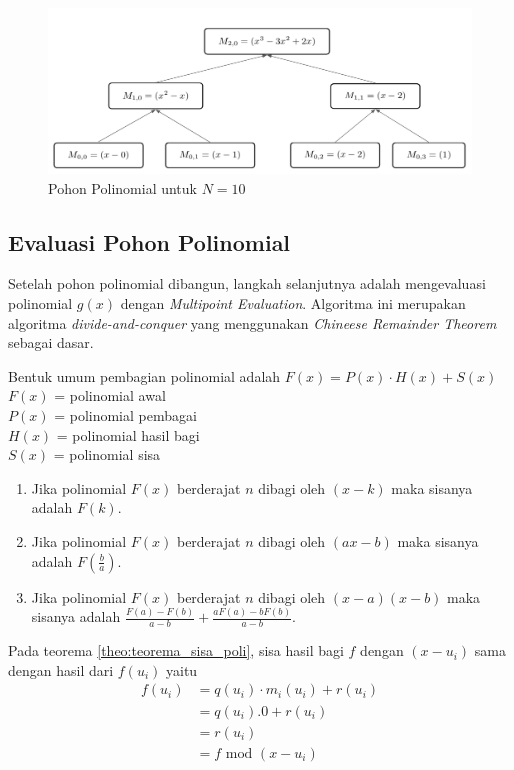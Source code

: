 \begin{figure}
	\Centering
	\includegraphics [scale=0.25]{bab2/img/pohon-polinomial-n-10}
	\caption {Pohon Polinomial untuk $ N  = 10 $}
	\label {fig:pohon-polinomial-n-10}
\end{figure}

\subsection{ Evaluasi Pohon Polinomial}
\label{sec:evaluasi_pohon_polinomial}
Setelah pohon polinomial dibangun, langkah selanjutnya adalah mengevaluasi polinomial $ g(x) $ dengan \textit{Multipoint Evaluation}. Algoritma ini merupakan algoritma \textit{divide-and-conquer} yang menggunakan \textit{Chineese Remainder Theorem} sebagai dasar.
\begin{theo}
	\label{theo:teorema_sisa_poli}
	Bentuk umum pembagian polinomial adalah $ F(x) = P(x) \cdot H(x) + S(x) $ \\
	$ F(x) $ = polinomial awal \\
	$ P(x) $ = polinomial pembagai \\
	$ H(x) $ = polinomial hasil bagi \\
	$ S(x) $ = polinomial sisa \\
	\begin{enumerate}
		\item Jika polinomial $ F(x) $ berderajat $ n $ dibagi oleh $ (x - k) $ maka sisanya adalah $ F(k) $.
		\item Jika polinomial $ F(x) $ berderajat $ n $ dibagi oleh $ (ax - b) $ maka sisanya adalah $ F(\frac{b}{a}) $.
		\item Jika polinomial $ F(x) $ berderajat $ n $ dibagi oleh $ (x - a)(x - b) $ maka sisanya adalah $ \frac{F(a) - F(b)}{a - b} +  \frac{aF(a) - bF(b)}{a - b}$.
	\end{enumerate}
\end{theo}
Pada teorema \ref{theo:teorema_sisa_poli}, sisa hasil bagi $ f $ dengan $ (x - u_i ) $ sama dengan hasil dari $ f(u_i) $ yaitu 
\begin{equation}
	\begin{aligned}
		f(u_i) &= q(u_i) \cdot m_i(u_i) + r(u_i) \\
			   &= q(u_i).0 + r(u_i) \\
			   &= r(u_i) \\
			   &= f \text{ mod } (x - u_i)
	\end{aligned}
	\label{eq:f_mod_ui}
\end{equation}

